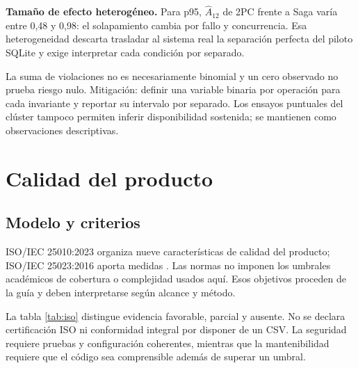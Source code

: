 \documentclass[12pt,a4paper]{article}
\newcommand{\seccion}[1]{\section{#1}}
\begin{document}
\textbf{Tamaño de efecto heterogéneo.} Para p95, \(\widehat A_{12}\) de 2PC frente a Saga varía entre 0,48 y 0,98: el solapamiento cambia por fallo y concurrencia. Esa heterogeneidad descarta trasladar al sistema real la separación perfecta del piloto SQLite y exige interpretar cada condición por separado.

La suma de violaciones no es necesariamente binomial y un cero observado no prueba riesgo nulo. Mitigación: definir una variable binaria por operación para cada invariante y reportar su intervalo por separado. Los ensayos puntuales del clúster tampoco permiten inferir disponibilidad sostenida; se mantienen como observaciones descriptivas.

\seccion{Calidad del producto}
\subsection{Modelo y criterios}
ISO/IEC 25010:2023 organiza nueve características de calidad del producto; ISO/IEC 25023:2016 aporta medidas \cite{iso25010_2023,iso25023_2016}. Las normas no imponen los umbrales académicos de cobertura o complejidad usados aquí. Esos objetivos proceden de la guía y deben interpretarse según alcance y método.

La tabla \ref{tab:iso} distingue evidencia favorable, parcial y ausente. No se declara certificación ISO ni conformidad integral por disponer de un CSV. La seguridad requiere pruebas y configuración coherentes, mientras que la mantenibilidad requiere que el código sea comprensible además de superar un umbral.
\end{document}
